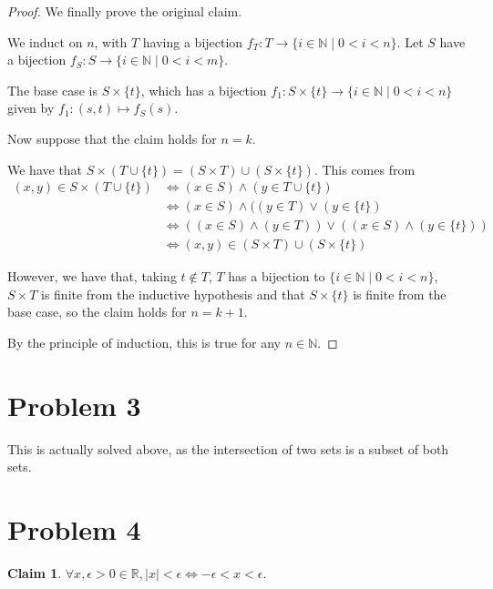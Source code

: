 \documentclass[12pt,letterpaper]{article}
\theoremstyle{definition}
\newtheorem*{claim}{Claim}
\newcommand{\R}{\mathbb{R}}
\newcommand{\N}{\mathbb{N}}
\begin{document}
\begin{proof}
    We finally prove the original claim.

    We induct on $n$, with $T$ having a bijection $f_T: T \rightarrow \{i \in \N \mid 0 < i < n\}$.
    Let $S$ have a bijection $f_S: S \rightarrow \{i \in \N \mid 0 < i < m\}$.

    The base case is $S \times \{t\}$, which has a bijection $f_1: S\times \{t\} \rightarrow  \{i \in \N \mid 0 < i < n\}$
    given by $f_1: (s,t) \mapsto f_S(s)$.

    Now suppose that the claim holds for $n = k$.

    We have that $S \times (T \cup \{t\}) = (S \times T) \cup (S \times \{t\})$.
    This comes from 
    \begin{align*}
        (x,y) \in S \times (T \cup \{t\}) &\iff (x \in S) \land (y \in T \cup \{t\}) \\
        &\iff (x \in S) \land ((y \in T) \lor (y \in \{t\}) \\
        &\iff ((x \in S) \land (y \in T)) \lor ((x\in S) \land (y \in \{t\})) \\
        &\iff (x,y) \in (S \times T) \cup (S \times \{t\})
    \end{align*}

    However, we have that, taking $t \notin T$, $T$ has a bijection to $\{i \in \N \mid 0 < i < n\}$, $S \times T$ is finite from the inductive hypothesis and that
    $S \times \{t\}$ is finite from the base case, so the claim holds for $n = k+1$.

    By the principle of induction, this is true for any $n \in \N$.
\end{proof}

\section*{Problem 3}

This is actually solved above, as the intersection of two sets is a subset of both sets.

\section*{Problem 4}

\begin{claim}
    $\forall x, \epsilon > 0 \in \R, |x| < \epsilon \iff -\epsilon < x < \epsilon$.
\end{claim}
\end{document}
